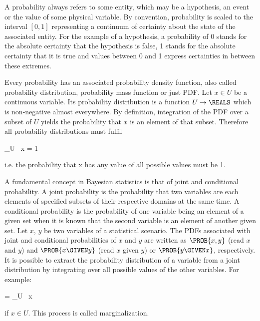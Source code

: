 \startsection[title={Bayesian Statistics}]

    A probability always refers to some entity, which may be a hypothesis, an
    event or the value of some physical variable. By convention, probability is
    scaled to the interval $[0, 1]$ representing a continuum of certainty about
    the state of the associated entity. For the example of a hypothesis,
    a probability of 0 stands for the absolute certainty that the hypothesis is
    false, 1 stands for the absolute certainty that it is true and values
    between 0 and 1 express certainties in between these extremes.

    Every probability has an associated probability density function, also
    called probability distribution, probability mass function or just PDF.
    Let $x \in U$ be a continuous variable. Its probability distribution is
    a function $U \rightarrow \REALS$ which is non-negative almost everywhere.
    By definition, integration of the PDF over a subset of $U$ yields the probability that
    $x$ is an element of that subset. Therefore all probability distributions
    must fulfil

    \placeformula[eq:probaint]
    \startformula
        \int_U  \, \diff x = 1 \EQCOMMA
    \stopformula
    
    i.e. the probability that x has any value of all possible values must
    be 1.

    A fundamental concept in Bayesian statistics is that of joint and
    conditional probability. A joint probability is the probability that two
    variables are each elements of specified subsets of their respective
    domains at the same time. A conditional probability is the probability of
    one variable being an element of a given set when it is known that the
    second variable is an element of another given set. Let $x$, $y$ be two
    variables of a statistical scenario. The PDFs associated with joint and
    conditional probabilities of $x$ and $y$ are written as $\PROB{x, y}$ (read
    $x$ and $y$) and $\PROB{x \GIVEN y}$ (read $x$ given $y$) or $\PROB{y
    \GIVEN x}$, respectively. It is possible to extract the probability
    distribution of a variable from a joint distribution by integrating
    over all possible values of the other variables. For example:

    \startformula
         = \int_U  \, \diff x
    \stopformula

    if $x \in U$. This process is called marginalization.

